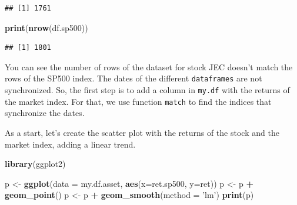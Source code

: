 \documentclass[11pt,]{book}
\newenvironment{Shaded}{\begin{snugshade}}{\end{snugshade}}
\newcommand{\KeywordTok}[1]{\textcolor[rgb]{0.27,0.27,0.27}{\textbf{#1}}}
\newcommand{\DataTypeTok}[1]{\textcolor[rgb]{0.27,0.27,0.27}{#1}}
\newcommand{\StringTok}[1]{\textcolor[rgb]{0.5,0.5,0.5}{#1}}
\newcommand{\CommentTok}[1]{\textcolor[rgb]{0.56,0.35,0.01}{\textit{#1}}}
\newcommand{\OperatorTok}[1]{\textcolor[rgb]{0.81,0.36,0.00}{\textbf{#1}}}
\newcommand{\NormalTok}[1]{#1}
\begin{document}
\begin{verbatim}
## [1] 1761
\end{verbatim}

\begin{Shaded}
\begin{Highlighting}[]
\KeywordTok{print}\NormalTok{(}\KeywordTok{nrow}\NormalTok{(df.sp500))}
\end{Highlighting}
\end{Shaded}

\begin{verbatim}
## [1] 1801
\end{verbatim}

You can see the number of rows of the dataset for stock JEC doesn't
match the rows of the SP500 index. The dates of the different
\texttt{dataframes} are not synchronized. So, the first step is to add a
column in \texttt{my.df} with the returns of the market index. For that,
we use function \texttt{match} to find the indices that synchronize the
dates.

\begin{Shaded}
\end{Shaded}

As a start, let's create the scatter plot with the returns of the stock
and the market index, adding a linear trend.

\begin{Shaded}
\begin{Highlighting}[]
\KeywordTok{library}\NormalTok{(ggplot2)}

\NormalTok{p <-}\StringTok{ }\KeywordTok{ggplot}\NormalTok{(}\DataTypeTok{data =}\NormalTok{ my.df.asset, }\KeywordTok{aes}\NormalTok{(}\DataTypeTok{x=}\NormalTok{ret.sp500, }\DataTypeTok{y=}\NormalTok{ret))}
\NormalTok{p <-}\StringTok{ }\NormalTok{p }\OperatorTok{+}\StringTok{ }\KeywordTok{geom_point}\NormalTok{()}
\NormalTok{p <-}\StringTok{ }\NormalTok{p }\OperatorTok{+}\StringTok{ }\KeywordTok{geom_smooth}\NormalTok{(}\DataTypeTok{method =} \StringTok{'lm'}\NormalTok{)}
\KeywordTok{print}\NormalTok{(p)}
\end{Highlighting}
\end{Shaded}
\end{document}
